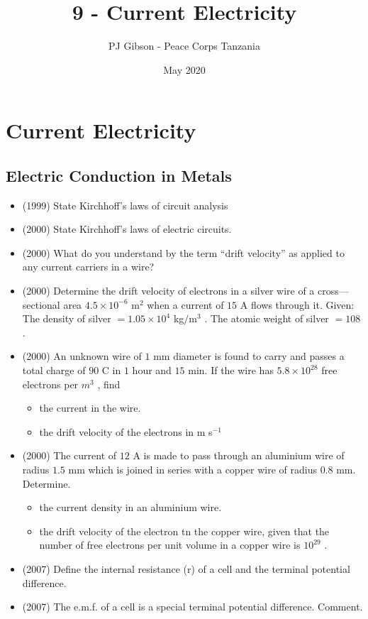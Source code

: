 \documentclass{article}
\title{\textbf{9 - Current Electricity}}
\author{PJ Gibson - Peace Corps Tanzania}
\date{May 2020}
\newcommand{\mysection}[2]{\setcounter{section}{#1}\addtocounter{section}{-1}\section{#2}}
\begin{document}
\maketitle


\mysection{9}{Current Electricity}

\subsection{Electric Conduction in Metals}
\begin{itemize}
\item (1999)  State Kirchhoff’s laws of circuit analysis
\item (2000)  State Kirchhoff’s laws of electric circuits.
\item (2000)  What do you understand by the term “drift velocity” as applied to any current carriers in a wire?
\item (2000)  Determine the drift velocity of electrons in a silver wire of a cross—sectional area $ 4.5 \times 10^{-6}$ m$ ^{2}$ when a current of $ 15$ A flows through it. Given: The density of silver $ =1.05 \times 10^{4}$ kg$/$m$ ^{3}$ . The atomic weight of silver $ =108$ .
\item (2000)  An unknown wire of $ 1$ mm diameter is found to carry and passes a total charge of $ 90$ C in $ 1$ hour and $ 15$ min. If the wire has $ 5.8 \times 10^{28}$ free electrons per $ m^{3}$ , find
 \begin{itemize}
\item  the current in the wire.
\item the drift velocity of the electrons in m s$ ^{-1}$
\end{itemize}
\item (2000)  The current of $ 12$ A is made to pass through an aluminium wire of radius $ 1.5$ mm which is joined in series with a copper wire of radius $ 0.8$ mm. Determine.
 \begin{itemize}
\item the current density in an aluminium wire.
\item the drift velocity of the electron tn the copper wire, given that the number of free electrons per unit volume in a copper wire is $ 10^{29}$ .
\end{itemize}
\item (2007)  Define the internal resistance (r) of a cell and the terminal potential difference.
\item (2007)  The e.m.f. of a cell is a special terminal potential difference.  Comment.

\end{itemize}
\end{document}

